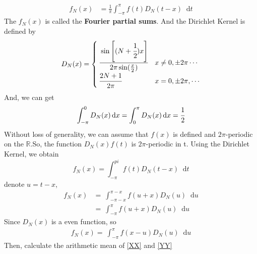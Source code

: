 \documentclass[margin,line]{res}
\newcommand*{\dif}{\mathop{}\!\mathrm{d}}
\begin{document}
\begin{resume}
\begin{itemize}
\begin{align}
	f_N(x) &=\frac{1}{\pi}\int_{-\pi}^{\pi}{f(t)D_N(t-x)} \dif t \nonumber
\end{align}
The $f_N(x)$ is called the \textbf{Fourier partial sums}. And the Dirichlet Kernel is defined by
\begin{align}
	D_N(x) = 
	\begin{cases}
		\cfrac{ \sin\left[ (N+\cfrac{1}{2})x \right] }{2\pi \sin(\frac{x}{2})} & x \neq 0,\pm 2\pi \cdots \\
		\cfrac{2N+1}{2\pi} & x=0,\pm 2\pi, \cdots
	\end{cases} \nonumber
\end{align}
And, we can get 
$$
\int_{-\pi}^{0} D_N(x) \dif x = 
\int_{0}^{\pi} D_N(x) \dif x =
\cfrac{1}{2}
$$
Without loss of generality, we can assume that $f(x)$ is defined and $2\pi$-periodic on the $\mathbb{R}$.So, the function $D_N(x)f(t)$ is $2\pi$-periodic in t.
Using the Dirichlet Kernel, we obtain
$$
f_N(x) = \int_{-\pi}^{pi} f(t) D_N(t-x) \dif t
$$
denote $u=t-x$,
\begin{align}
f_N(x) 	&= \ \int_{-\pi -x}^{\pi -x} f(u+x) D_N(u) \dif u \nonumber \\
	 	&= \ \int_{-\pi}^{\pi} f(u+x) D_N(u) \dif u \label{XX}
\end{align}
Since $D_N(x)$ is a even function, so
\begin{align}
f_N(x) = \ \int_{-\pi}^{\pi} f(x-u) D_N(u) \dif u \label{YY}
\end{align}
Then, calculate the arithmetic mean of \eqref{XX} and \eqref{YY}
\end{itemize}


\end{resume}
\end{document}
